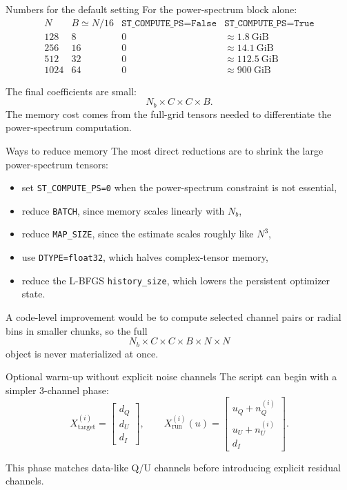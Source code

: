\documentclass[aspectratio=169,11pt]{beamer}
\begin{document}
\begin{frame}[fragile]{Numbers for the default setting}
For the power-spectrum block alone:
\[
\begin{array}{c|c|c|c}
N & B\simeq N/16 & \texttt{ST\_COMPUTE\_PS=False} & \texttt{ST\_COMPUTE\_PS=True}\\
\hline
128 & 8  & 0 & \approx 1.8\ \mathrm{GiB}\\
256 & 16 & 0 & \approx 14.1\ \mathrm{GiB}\\
512 & 32 & 0 & \approx 112.5\ \mathrm{GiB}\\
1024& 64 & 0 & \approx 900\ \mathrm{GiB}
\end{array}
\]

\vspace{0.25em}
The final coefficients are small:
\[
  N_b\times C\times C\times B.
\]
The memory cost comes from the full-grid tensors needed to differentiate the
power-spectrum computation.
\end{frame}

\begin{frame}[fragile]{Ways to reduce memory}
The most direct reductions are to shrink the large power-spectrum tensors:
\begin{itemize}
  \item set \texttt{ST\_COMPUTE\_PS=0} when the power-spectrum constraint is not essential,
  \item reduce \texttt{BATCH}, since memory scales linearly with $N_b$,
  \item reduce \texttt{MAP\_SIZE}, since the estimate scales roughly like $N^3$,
  \item use \texttt{DTYPE=float32}, which halves complex-tensor memory,
  \item reduce the L-BFGS \texttt{history\_size}, which lowers the persistent optimizer state.
\end{itemize}

\vspace{0.25em}
A code-level improvement would be to compute selected channel pairs or radial
bins in smaller chunks, so the full
\[
  N_b\times C\times C\times B\times N\times N
\]
object is never materialized at once.
\end{frame}

\begin{frame}[fragile]{Optional warm-up without explicit noise channels}
The script can begin with a simpler 3-channel phase:
\[
  X_{\mathrm{target}}^{(i)}=
  \begin{bmatrix}d_Q\\d_U\\d_I\end{bmatrix},
  \qquad
  X_{\mathrm{run}}^{(i)}(u)=
  \begin{bmatrix}u_Q+n_Q^{(i)}\\u_U+n_U^{(i)}\\d_I\end{bmatrix}.
\]

\vspace{0.25em}
This phase matches data-like Q/U channels before introducing explicit residual channels.
\end{frame}
\end{document}
